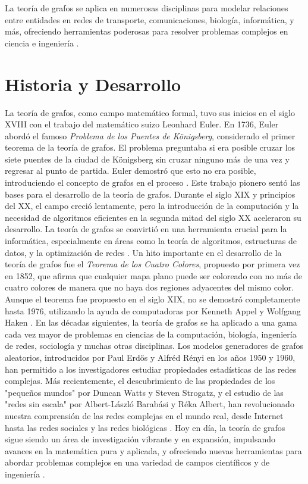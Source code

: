 La teoría de grafos se aplica en numerosas disciplinas para modelar relaciones entre entidades en redes de transporte, comunicaciones, biología, informática, y más, ofreciendo herramientas poderosas para resolver problemas complejos en ciencia e ingeniería \citep{West2000, Gross2004, Castillo2005} .

\section{Historia y Desarrollo}

La teoría de grafos, como campo matemático formal, tuvo sus inicios en el siglo XVIII con el trabajo del matemático suizo Leonhard Euler. En 1736, Euler abordó el famoso \textit{Problema de los Puentes de Königsberg}, considerado el primer teorema de la teoría de grafos. El problema preguntaba si era posible cruzar los siete puentes de la ciudad de Königsberg sin cruzar ninguno más de una vez y regresar al punto de partida. Euler demostró que esto no era posible, introduciendo el concepto de grafos en el proceso \citep{Wilson2008}.
Este trabajo pionero sentó las bases para el desarrollo de la teoría de grafos. Durante el siglo XIX y principios del XX, el campo creció lentamente, pero la introducción de la computación y la necesidad de algoritmos eficientes en la segunda mitad del siglo XX aceleraron su desarrollo. La teoría de grafos se convirtió en una herramienta crucial para la informática, especialmente en áreas como la teoría de algoritmos, estructuras de datos, y la optimización de redes .
Un hito importante en el desarrollo de la teoría de grafos fue el \textit{Teorema de los Cuatro Colores}, propuesto por primera vez en 1852, que afirma que cualquier mapa plano puede ser coloreado con no más de cuatro colores de manera que no haya dos regiones adyacentes del mismo color. Aunque el teorema fue propuesto en el siglo XIX, no se demostró completamente hasta 1976, utilizando la ayuda de computadoras por Kenneth Appel y Wolfgang Haken \citep{Wilson2008} .
En las décadas siguientes, la teoría de grafos se ha aplicado a una gama cada vez mayor de problemas en ciencias de la computación, biología, ingeniería de redes, sociología y muchas otras disciplinas. Los modelos generadores de grafos aleatorios, introducidos por Paul Erdős y Alfréd Rényi en los años 1950 y 1960, han permitido a los investigadores estudiar propiedades estadísticas de las redes complejas. Más recientemente, el descubrimiento de las propiedades de los "pequeños mundos" por Duncan Watts y Steven Strogatz, y el estudio de las "redes sin escala" por Albert-László Barabási y Réka Albert, han revolucionado nuestra comprensión de las redes complejas en el mundo real, desde Internet hasta las redes sociales y las redes biológicas \citep{Newman2010, Bollobas2001, Caldarelli2007} .
Hoy en día, la teoría de grafos sigue siendo un área de investigación vibrante y en expansión, impulsando avances en la matemática pura y aplicada, y ofreciendo nuevas herramientas para abordar problemas complejos en una variedad de campos científicos y de ingeniería \citep{West2000, Gross2004, Castillo2005} .


